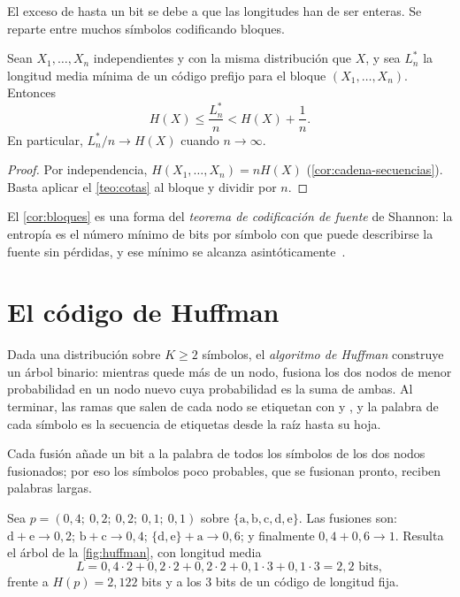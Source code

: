 El exceso de hasta un bit se debe a que las longitudes han de ser enteras. Se reparte entre muchos símbolos codificando bloques.

\begin{corolario}\label{cor:bloques}
Sean $X_1,\dots,X_n$ independientes y con la misma distribución que $X$, y sea $L_n^{*}$ la longitud media mínima de un código prefijo para el bloque $(X_1,\dots,X_n)$. Entonces
\[
H(X)\le\frac{L_n^{*}}{n}<H(X)+\frac1n.
\]
En particular, $L_n^{*}/n\to H(X)$ cuando $n\to\infty$.
\end{corolario}

\begin{proof}
Por independencia, $H(X_1,\dots,X_n)=nH(X)$ (\cref{cor:cadena-secuencias}). Basta aplicar el \cref{teo:cotas} al bloque y dividir por $n$.
\end{proof}

El \cref{cor:bloques} es una forma del \emph{teorema de codificación de fuente} de Shannon: la entropía es el número mínimo de bits por símbolo con que puede describirse la fuente sin pérdidas, y ese mínimo se alcanza asintóticamente~\cite[cap.~4]{mackay}.

\section{El código de Huffman}

\begin{definicion}\label{def:huffman}
Dada una distribución sobre $K\ge 2$ símbolos, el \emph{algoritmo de Huffman} construye un árbol binario: mientras quede más de un nodo, fusiona los dos nodos de menor probabilidad en un nodo nuevo cuya probabilidad es la suma de ambas. Al terminar, las ramas que salen de cada nodo se etiquetan con  y , y la palabra de cada símbolo es la secuencia de etiquetas desde la raíz hasta su hoja.
\end{definicion}

Cada fusión añade un bit a la palabra de todos los símbolos de los dos nodos fusionados; por eso los símbolos poco probables, que se fusionan pronto, reciben palabras largas.

\begin{ejemplo}\label{ej:huffman}
Sea $p=(0{,}4;\ 0{,}2;\ 0{,}2;\ 0{,}1;\ 0{,}1)$ sobre $\{\mathrm{a},\mathrm{b},\mathrm{c},\mathrm{d},\mathrm{e}\}$. Las fusiones son: $\mathrm{d}+\mathrm{e}\to 0{,}2$; $\mathrm{b}+\mathrm{c}\to 0{,}4$; $\{\mathrm{d},\mathrm{e}\}+\mathrm{a}\to 0{,}6$; y finalmente $0{,}4+0{,}6\to 1$. Resulta el árbol de la \cref{fig:huffman}, con longitud media
\[
L=0{,}4\cdot 2+0{,}2\cdot 2+0{,}2\cdot 2+0{,}1\cdot 3+0{,}1\cdot 3=2{,}2\text{ bits},
\]
frente a $H(p)=2{,}122$ bits y a los 3 bits de un código de longitud fija.
\end{ejemplo}

